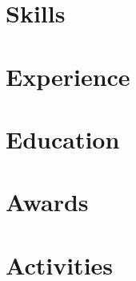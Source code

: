 \documentclass[letter,10pt]{article}
\begin{document}


\section{Skills}


\section{Experience}


\newpage
\section{Education}


\section{Awards}


\section{Activities}

\end{document}
